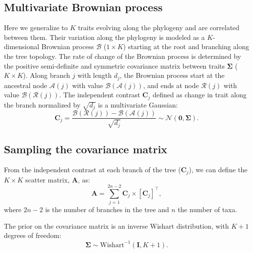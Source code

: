 \documentclass{article}
\newcommand{\MultiplyMatrix}{\times}
\newcommand{\UniDimArray}[1]{\bm{#1}}
\newcommand{\BiDimArray}[1]{\bm{#1}}
\newcommand{\tr}{^{\intercal}}
\newcommand{\NbrTaxa}{n}
\newcommand{\VecZero}{\UniDimArray{0}}
\newcommand{\Nbranch}{2 \NbrTaxa - 2}
\newcommand{\Ntrait}{K}
\newcommand{\contrast}{\UniDimArray{C}}
\newcommand{\Covariancematrix}{\Sigma}
\newcommand{\CovarianceMatrix}{\BiDimArray{\Covariancematrix}}
\newcommand{\Identitymatrix}{\BiDimArray{I}}
\newcommand{\brownian}{\mathcal{B}}
\newcommand{\Brownian}{\UniDimArray{\brownian}}
\newcommand{\Scattermatrix}{\BiDimArray{A}}
\begin{document}
\subsection{Multivariate Brownian process}\label{subsec:multivariate-brownian-process}
Here we generalize to $\Ntrait$ traits evolving along the phylogeny and are correlated between them.
Their variation along the phylogeny is modeled as a $\Ntrait$-dimensional Brownian process $\Brownian$ ($1 \times \Ntrait$) starting at the root and branching along the tree topology.
The rate of change of the Brownian process is determined by the positive semi-definite and symmetric covariance matrix between traits $\CovarianceMatrix$ ($\Ntrait \times \Ntrait$).
Along branch $j$ with length $d_{j}$, the Brownian process start at the ancestral node $\mathcal{A}(j)$ with value $\Brownian(\mathcal{A}(j))$, and ends at node $\mathcal{R}(j)$  with value $\Brownian(\mathcal{R}(j))$.
The independent contrast $\contrast_{j}$ defined as change in trait along the branch normalized by $\sqrt {d_{j}}$ is a multivariate Gaussian:
\begin{equation}
    \label{eq:DistribBrownian}
    \contrast_{j} = \frac{\Brownian (\mathcal{R}(j)) - \Brownian (\mathcal{A}(j)) }{\sqrt {d_{j}}} \sim \mathcal{N}\left(\VecZero, \CovarianceMatrix \right).
\end{equation}

\subsection{Sampling the covariance matrix}\label{subsec:sampling-the-covariance-matrix}
From the independent contrast at each branch of the tree ($\contrast_{j}$), we can define the $\Ntrait \times \Ntrait$ scatter matrix, $\Scattermatrix$, as:
\begin{equation}
    \Scattermatrix = \sum\limits_{j=1}^{\Nbranch} \contrast_{j} \MultiplyMatrix \left[\contrast_{j}\right]\tr\label{eq:bayes-scatter},
\end{equation}
where $\Nbranch$ is the number of branches in the tree and $\NbrTaxa$ the number of taxa.

The {prior} on the covariance matrix is an inverse Wishart distribution, with $\Ntrait + 1$ degrees of freedom:
\begin{equation}
    \label{eq:Distribcovariance}
    \CovarianceMatrix \sim \text{Wishart}^{-1} (\Identitymatrix, \Ntrait + 1).
\end{equation}
\end{document}
